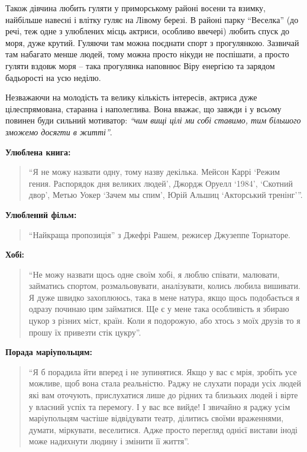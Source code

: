 Також дівчина любить гуляти у приморському районі восени та
взимку, найбільше навесні і влітку гуляє на Лівому березі. В районі парку
\enquote{Веселка} (до речі, теж одне з улюблених місць актриси, особливо
ввечері) любить спуск до моря, дуже крутий.  Гуляючи там можна поєднати спорт з
прогулянкою. Зазвичай там набагато менше людей, тому можна просто нікуди не
поспішати, а просто гуляти вздовж моря – така прогулянка наповнює Віру енергією
та зарядом бадьорості на усю неділю.

Незважаючи на молодість та велику кількість інтересів, актриса дуже
цілеспрямована, старанна і наполеглива. Вона вважає, що завжди і у всьому
повинен буди сильний мотиватор: \emph{\enquote{чим вищі цілі ми собі ставимо, тим більшого
зможемо досягти в житті}}.

\begingroup
\em

\textbf{Улюблена книга:} 

\begin{quote}
\enquote{Я не можу назвати одну, тому назву декілька.  Мейсон Каррі
\enquote{Режим гения. Распорядок дня великих людей}, Джордж Оруелл \enquote{1984}, \enquote{Скотний
двор}, Метью Уокер \enquote{Зачем мы спим}, Юрій Альшиц \enquote{Акторський тренінг}}.
\end{quote}

\textbf{Улюблений фільм:} 

\begin{quote}
\enquote{Найкраща пропозиція} з Джефрі Рашем, режисер Джузеппе
Торнаторе.
\end{quote}

\textbf{Хобі:} 

\begin{quote}
\enquote{Не можу назвати щось одне своїм хобі, я люблю співати, малювати,
займатись спортом, розмальовувати, аналізувати, колись любила вишивати. Я дуже
швидко захоплююсь, така в мене натура, якщо щось подобається я одразу починаю
цим займатися. Ще є у мене така особливість я збираю цукор з різних міст,
країн. Коли я подорожую, або хтось з моїх друзів то я прошу їх привезти стік
цукру}.
\end{quote}

\textbf{Порада маріупольцям:} 

\begin{quote}
\enquote{Я б порадила йти вперед і не зупинятися. Якщо у вас є
мрія, зробіть усе можливе, щоб вона стала реальністю. Раджу не слухати поради
усіх людей які вам оточують, прислухатися лише до рідних та близьких людей і
вірте у власний успіх та перемогу. І у вас все вийде! І звичайно я раджу усім
маріупольцям частіше відвідувати театр, ділитись своїми враженнями, думати,
міркувати, веселитися. Адже просто перегляд однієї вистави іноді може надихнути
людину і змінити її життя}.
\end{quote}

